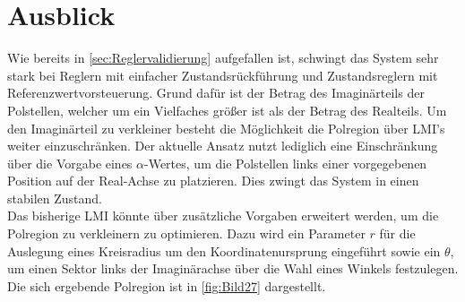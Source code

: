 \section{Ausblick} \label{sec:ausblick}

Wie bereits in \autoref{sec:Reglervalidierung} aufgefallen ist, schwingt das System sehr stark bei Reglern mit einfacher Zustandsrückführung und Zustandsreglern mit Referenzwertvorsteuerung. Grund dafür ist der Betrag des Imaginärteils der Polstellen, welcher um ein Vielfaches größer ist als der Betrag des Realteils. Um den Imaginärteil zu verkleiner besteht die Möglichkeit die Polregion über LMI's weiter einzuschränken. Der aktuelle Ansatz nutzt lediglich eine Einschränkung über die Vorgabe eines $\alpha$-Wertes, um die Polstellen links einer vorgegebenen Position auf der Real-Achse zu platzieren. Dies zwingt das System in einen stabilen Zustand.\\
Das bisherige LMI könnte über zusätzliche Vorgaben erweitert werden, um die Polregion zu verkleinern \bzw zu optimieren. Dazu wird ein Parameter $r$ für die Auslegung eines Kreisradius um den Koordinatenursprung eingeführt sowie ein $\theta$, um einen Sektor links der Imaginärachse über die Wahl eines Winkels festzulegen. Die sich ergebende Polregion ist in \autoref{fig:Bild27} dargestellt.\\

